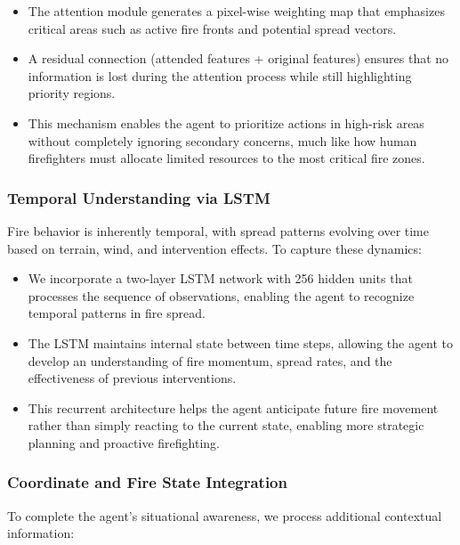 \documentclass[conference]{IEEEtran}
\begin{document}
\begin{itemize}
    \item The attention module generates a pixel-wise weighting map that emphasizes critical areas such as active fire fronts and potential spread vectors.
    
    \item A residual connection (attended features + original features) ensures that no information is lost during the attention process while still highlighting priority regions.
    
    \item This mechanism enables the agent to prioritize actions in high-risk areas without completely ignoring secondary concerns, much like how human firefighters must allocate limited resources to the most critical fire zones.
\end{itemize}

\subsubsection{Temporal Understanding via LSTM}
Fire behavior is inherently temporal, with spread patterns evolving over time based on terrain, wind, and intervention effects. To capture these dynamics:

\begin{itemize}
    \item We incorporate a two-layer LSTM network with 256 hidden units that processes the sequence of observations, enabling the agent to recognize temporal patterns in fire spread.
    
    \item The LSTM maintains internal state between time steps, allowing the agent to develop an understanding of fire momentum, spread rates, and the effectiveness of previous interventions.
    
    \item This recurrent architecture helps the agent anticipate future fire movement rather than simply reacting to the current state, enabling more strategic planning and proactive firefighting.
\end{itemize}

\subsubsection{Coordinate and Fire State Integration}
To complete the agent's situational awareness, we process additional contextual information:
\end{document}
